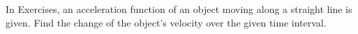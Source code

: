 \begin{exerciseset}{In Exercises}{, an acceleration function of an object moving along a straight line is given. Find the change of the object's velocity over the given time interval.}





\end{exerciseset}
